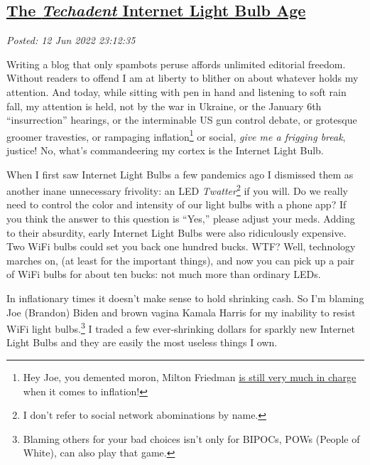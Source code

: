 %

\subsection*{\href{https://analyzethedatanotthedrivel.org/2022/06/12/the-techadent-internet-light-bulb-age/}{The \emph{Techadent} Internet Light Bulb Age}}


\noindent\emph{Posted: 12 Jun 2022 23:12:35}
\vspace{6pt}

Writing a blog that only spambots peruse affords unlimited editorial
freedom. Without readers to offend I am at liberty to blither on about
whatever holds my attention. And today, while sitting with pen in hand
and listening to soft rain fall, my attention is held, not by the war in
Ukraine, or the January 6th ``insurrection'' hearings, or the
interminable US gun control debate, or grotesque groomer travesties, or
rampaging
inflation\footnote{Hey Joe, you demented moron, Milton Friedman \href{https://www.wsj.com/articles/milton-friedman-biden-spending-inflation-free-market-carter-afghanistan-southern-border-11637014161}{is still very much in
  charge} when it comes to inflation!
}%
or social, \emph{give me a frigging break}, justice! No, what's
commandeering my cortex is the Internet Light Bulb.

When I first saw Internet Light Bulbs a few pandemics ago I dismissed
them as another inane unnecessary frivolity: an LED
\emph{Twatter}\footnote{I don't refer to social network abominations by
  name.
}%
if you will. Do we really need to control the color and intensity of our
light bulbs with a phone app? If you think the answer to this question
is ``Yes,'' please adjust your meds. Adding to their absurdity, early
Internet Light Bulbs were also ridiculously expensive. Two WiFi bulbs
could set you back one hundred bucks. WTF? Well, technology marches on,
(at least for the important things), and now you can pick up a pair of
WiFi bulbs for about ten bucks: not much more than ordinary LEDs.

In inflationary times it doesn't make sense to hold shrinking cash. So
I'm blaming Joe (Brandon) Biden and brown vagina Kamala Harris for my
inability to resist WiFi light
bulbs.\footnote{Blaming others for your bad choices isn't only for BIPOCs, POWs
  (People of White), can also play that
  game.
}%
I traded a few ever-shrinking dollars for sparkly new Internet Light
Bulbs and they are easily the most useless things I own.

